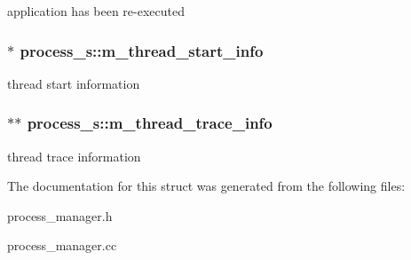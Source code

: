 \label{structprocess__s_a7f5a5304526964f084a24b68b0132d7a}
application has been re-\/executed \hypertarget{structprocess__s_a948322a5587615947b1080e04f2c76b8}{
\subsubsection[{m\_\-thread\_\-start\_\-info}]{$\ast$ {\bf process\_\-s::m\_\-thread\_\-start\_\-info}}}
\label{structprocess__s_a948322a5587615947b1080e04f2c76b8}
thread start information \hypertarget{structprocess__s_ad7a7f06130499ec66febeab3aa686d5b}{
\subsubsection[{m\_\-thread\_\-trace\_\-info}]{$\ast$$\ast$ {\bf process\_\-s::m\_\-thread\_\-trace\_\-info}}}
\label{structprocess__s_ad7a7f06130499ec66febeab3aa686d5b}
thread trace information 

The documentation for this struct was generated from the following files:\begin{DoxyCompactItemize}
\item 
process\_\-manager.h\item 
process\_\-manager.cc\end{DoxyCompactItemize}
